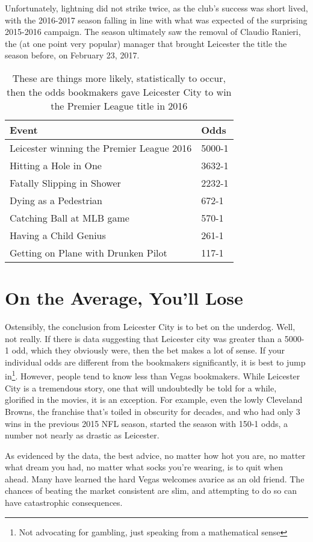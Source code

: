 \documentclass[../../fulltext/fulltext.tex]{subfiles}
\begin{document}
Unfortunately, lightning did not strike twice, as the club's success was short lived, with the 2016-2017 season falling in line with what was expected of the surprising 2015-2016 campaign. The season ultimately saw the removal of Claudio Ranieri, the (at one point very popular) manager that brought Leicester the title the season before, on February 23, 2017.
\begin{table}[t!]
	\centering
	\begin{tabular}{|l||l|}
		\hline
		Event                                     & Odds    \\ \hline
		Leicester winning the Premier League 2016 & 5000-1  \\ \hline
		Hitting a Hole in One                     & 3632-1  \\ \hline
		Fatally Slipping in Shower                & 2232-1  \\ \hline
		Dying as a Pedestrian                     & 672-1   \\ \hline
		Catching Ball at MLB game                 & 570-1   \\ \hline
		Having a Child Genius &261-1 \\ \hline
		Getting on Plane with Drunken Pilot       & 117-1 \\ \hline
	\end{tabular}
	\caption{These are things more likely, statistically to occur, then the odds bookmakers gave Leicester City to win the Premier League title in 2016\cite{leicester7}}
	\label{tab:leic}
\end{table}
\section{On the Average, You'll Lose}

Ostensibly, the conclusion from Leicester City is to bet on the underdog.  Well, not really.  If there is data suggesting that Leicester city was greater than a 5000-1 odd, which they obviously were, then the bet makes a lot of sense.  If your individual odds are different from the bookmakers significantly, it is best to jump in\footnote{Not advocating for gambling, just speaking from a mathematical sense}.  However, people tend to know less than Vegas bookmakers.  While Leicester City is a tremendous story, one that will undoubtedly be told for a while, glorified in the movies, it is an exception.  For example, even the lowly Cleveland Browns, the franchise that's toiled in obscurity for decades, and who had only 3 wins in the previous 2015 NFL season, started the season with 150-1 odds, a number not nearly as drastic as Leicester\cite{leicester}.  


 As evidenced by the data, the best advice, no matter how hot you are, no matter what dream you had, no matter what socks you're wearing, is to quit when ahead.  Many have learned the hard Vegas welcomes avarice as an old friend. The chances of beating the market consistent are slim, and attempting to do so can have catastrophic consequences. 
\end{document}
